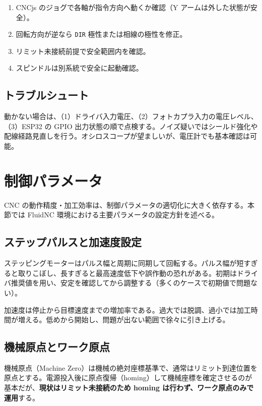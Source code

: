 \documentclass[uplatex,dvipdfmx]{ujarticle}
\begin{document}
\begin{enumerate}
  \item CNCjs のジョグで各軸が指令方向へ動くか確認（Y アームは外した状態が安全）。
  \item 回転方向が逆なら \texttt{DIR} 極性または相線の極性を修正。
  \item リミット未接続前提で安全範囲内を確認。
  \item スピンドルは別系統で安全に起動確認。
\end{enumerate}

\subsection{トラブルシュート}

動かない場合は、（1）ドライバ入力電圧、（2）フォトカプラ入力の電圧レベル、（3）ESP32 の GPIO 出力状態の順で点検する。ノイズ疑いではシールド強化や配線経路見直しを行う。オシロスコープが望ましいが、電圧計でも基本確認は可能。

\section{制御パラメータ}

CNC の動作精度・加工効率は、制御パラメータの適切化に大きく依存する。本節では FluidNC 環境における主要パラメータの設定方針を述べる。

\subsection{ステップパルスと加速度設定}

ステッピングモーターはパルス幅と周期に同期して回転する。パルス幅が短すぎると取りこぼし、長すぎると最高速度低下や誤作動の恐れがある。初期はドライバ推奨値を用い、安定を確認してから調整する（多くのケースで初期値で問題ない）。

加速度は停止から目標速度までの増加率である。過大では脱調、過小では加工時間が増える。低めから開始し、問題が出ない範囲で徐々に引き上げる。

\subsection{機械原点とワーク原点}

機械原点（Machine Zero）は機械の絶対座標基準で、通常はリミット到達位置を原点とする。電源投入後に原点復帰（homing）して機械座標を確定させるのが基本だが、\textbf{現状はリミット未接続のため homing は行わず、ワーク原点のみで運用}する。
\end{document}
